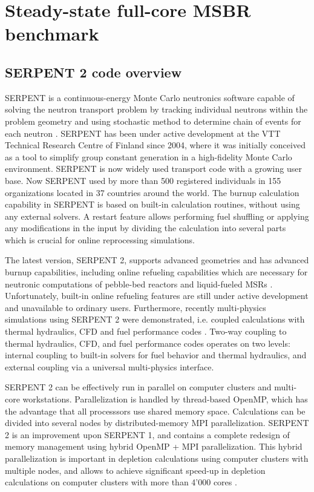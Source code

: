 \chapter[Steady-state full-core MSBR benchmark]{Steady-state full-core MSBR benchmark}

\section{SERPENT 2 code overview}

SERPENT is a continuous-energy Monte Carlo neutronics software capable of solving the neutron transport problem by tracking individual neutrons within the problem geometry and using stochastic method to determine chain of events for each neutron \cite{leppanen_serpent_2015}. SERPENT has been under active development at the VTT Technical Research Centre of Finland since 2004, where it was initially conceived as a tool to simplify group constant generation in a high-fidelity Monte Carlo environment. SERPENT is now widely used transport code  with a growing user base. Now SERPENT used by more than 500 registered individuals in 155 organizations located in 37 countries around the world. The burnup calculation capability in SERPENT is based on built-in calculation routines, without using any external solvers. A restart feature allows performing fuel shuffling or applying any modifications in the input by dividing the calculation into several parts which is crucial for online reprocessing simulations.

The latest version, SERPENT 2, supports advanced geometries and has advanced burnup capabilities, including online refueling capabilities which are necessary for neutronic computations of pebble-bed reactors and liquid-fueled \glspl{MSR} \cite{aufiero_extended_2013}. Unfortunately, built-in online refueling features are still under active development and unavailable to ordinary users. Furthermore, recently multi-physics simulations using SERPENT 2 were demonstrated, i.e. coupled calculations with thermal hydraulics, \gls{CFD} and fuel performance codes \cite{leppanen_numerical_2015}. Two-way coupling to thermal hydraulics, \gls{CFD}, and fuel performance codes operates on two levels: internal coupling to built-in solvers for fuel behavior and thermal hydraulics, and external coupling via a universal multi-physics interface. 

SERPENT 2 can be effectively run in parallel on computer clusters and multi-core workstations. Parallelization is handled by thread-based OpenMP, which has the advantage that all processsors use shared memory space. Calculations can be divided into several nodes by distributed-memory \gls{MPI} parallelization. SERPENT 2  is an improvement upon SERPENT 1, and contains a complete redesign of memory management using hybrid OpenMP \cite{dagum_openmp:_1998} + \gls{MPI} parallelization.  This hybrid parallelization is important in depletion calculations using computer clusters with multiple nodes, and allows to achieve significant speed-up in depletion calculations on computer clusters with more than 4'000 cores \cite{leppanen_serpent_2015-1}. 

